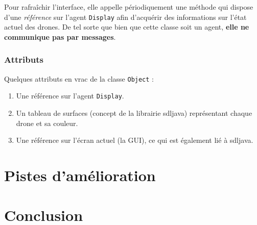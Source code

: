 \documentclass[11pt]{report}
\begin{document}
Pour rafraîchir l'interface, elle appelle périodiquement une méthode qui dispose d'une \textit{référence} sur l'agent \verb|Display| afin d'acquérir des informations sur l'état actuel des drones. De tel sorte que bien que cette classe soit un agent, \textbf{elle ne communique pas par messages}.

\subsubsection{Attributs}

Quelques attributs en vrac de la classe \verb|Object| :

\begin{enumerate}
\item Une référence sur l'agent \verb|Display|.

\item Un tableau de surfaces (concept de la librairie sdljava) représentant chaque drone et sa couleur.

\item Une référence sur l'écran actuel (la GUI), ce qui est également lié à sdljava.
\end{enumerate}

\section{Pistes d'amélioration}

\section{Conclusion}
\end{document}
